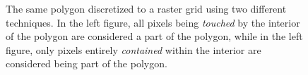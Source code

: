 \begin{figure}[H]
  \centering
  
  \hspace{2em}
  
  \caption{
    The same polygon discretized to a raster grid using two different techniques.
    In the left figure, all pixels being \textit{touched} by the interior of the polygon
    are considered a part of the polygon, while in the left figure, only pixels
    entirely \textit{contained} within the interior are considered being part
    of the polygon.
  }
\end{figure}
